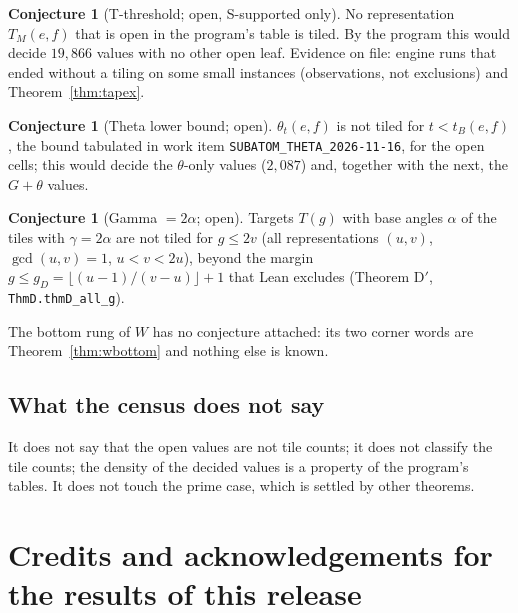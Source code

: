\documentclass[11pt,reqno]{amsart}
\theoremstyle{plain}
\theoremstyle{definition}
\newtheorem{conjecture}[theorem]{Conjecture}
\newcommand{\sS}{\textup{\textsf{S}}}
\newcommand{\rec}[1]{\textup{\texttt{#1}}}
\begin{document}
\begin{conjecture}[T-threshold; open, \sS-supported only]\label{conj:T}
No representation $T_M(e,f)$ that is open in the program's table is tiled. By the program this would decide $19{,}866$
values with no other open leaf. Evidence on file: engine runs that ended without a tiling on some small instances (observations, not exclusions) and Theorem~\ref{thm:tapex}.
\end{conjecture}
\begin{conjecture}[Theta lower bound; open]\label{conj:theta}
$\theta_t(e,f)$ is not tiled for $t<t_B(e,f)$, the bound tabulated in work item \rec{SUBATOM\_THETA\_2026-11-16}, for the
open cells; this would decide the $\theta$-only values ($2{,}087$) and, together with the next, the $G+\theta$ values.
\end{conjecture}
\begin{conjecture}[Gamma $=2\alpha$; open]\label{conj:G}
Targets $T(g)$ with base angles $\alpha$ of the tiles with $\gamma=2\alpha$ are not tiled for $g\le2v$ (all
representations $(u,v)$, $\gcd(u,v)=1$, $u<v<2u$), beyond the margin $g\le g_D=\lfloor(u-1)/(v-u)\rfloor+1$ that Lean
excludes (Theorem D$'$, \texttt{ThmD.thmD\_all\_g}).
\end{conjecture}
\noindent The bottom rung of $W$ has no conjecture attached: its two corner words are Theorem~\ref{thm:wbottom} and
nothing else is known.

\subsection{What the census does not say}\label{sub:cen:not}
It does not say that the open values are not tile counts; it does not classify the tile counts; the density of
the decided values is a property of the program's tables. It does not touch the prime case, which is settled
by other theorems.

\section*{Credits and acknowledgements for the results of this release}\label{sec:credits_v6}
\end{document}
